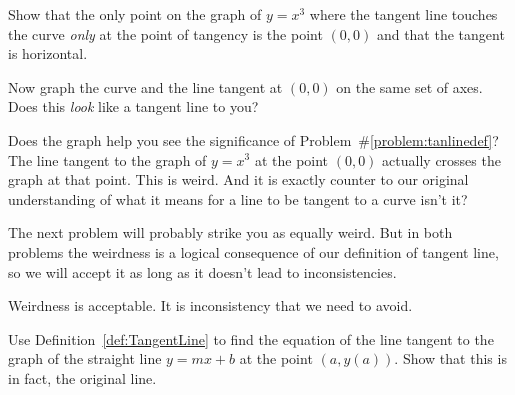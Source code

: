   \begin{embeddedproblem}
    \label{problem:tanlinedef}
    Show that the only point on the graph of $y=x^3$ where the tangent
    line touches the curve \emph{only} at the point of tangency is the
    point $(0, 0)$ and that the tangent is horizontal.

    Now graph the curve and the line tangent at $(0,0)$ on the same
    set of axes. Does this \emph{look} like a tangent line to you?
  \end{embeddedproblem}
  
Does the graph help you see the significance of Problem~\#\ref{problem:tanlinedef}? The
line tangent to the graph of $y=x^3$ at the point $(0,0)$
actually crosses the graph at that point.
This is weird. And it is exactly counter to our original understanding
of what it means for a line to be tangent to a curve isn't it?

The next problem will probably strike you as equally weird. But in
both problems the weirdness is a logical consequence of our definition
of tangent line, so we will accept it as long as it doesn't lead to
inconsistencies.

Weirdness is acceptable. It is inconsistency that we need to avoid.

\begin{embeddedproblem}
  Use Definition~\ref{def:TangentLine} to find the equation of the
  line tangent to the graph of the straight line $y=mx+b$ at the point
  $(a, y(a))$. Show that this is in fact, the original line.
  \vskip-6mm{}
\end{embeddedproblem}

